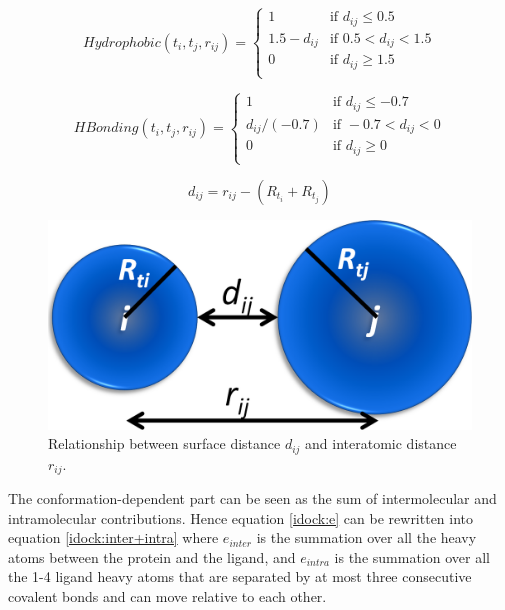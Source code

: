 \begin{equation}
\label{idock:Hydrophobic}
Hydrophobic(t_i, t_j, r_{ij}) =
\begin{cases}
1 & \text{if } d_{ij} \leq 0.5\\
1.5 - d_{ij} & \text{if } 0.5 < d_{ij} < 1.5\\
0 & \text{if } d_{ij} \geq 1.5\\
\end{cases}
\end{equation}

\begin{equation}
\label{idock:HBonding}
HBonding(t_i, t_j, r_{ij}) =
\begin{cases}
1 & \text{if } d_{ij} \leq -0.7\\
d_{ij} / (-0.7) & \text{if } -0.7 < d_{ij} < 0\\
0 & \text{if } d_{ij} \geq 0\\
\end{cases}
\end{equation}

\begin{equation}
\label{idock:d_ij}
d_{ij} = r_{ij} - (R_{t_i} + R_{t_j})
\end{equation}

\begin{figure}
\centering
\includegraphics[width=\linewidth]{../idock/Distance.png}
\caption{Relationship between surface distance $d_{ij}$ and interatomic distance $r_{ij}$.}
\label{idock:Distance}
\end{figure}

The conformation-dependent part can be seen as the sum of intermolecular and intramolecular contributions. Hence equation \eqref{idock:e} can be rewritten into equation \eqref{idock:inter+intra} where $e_{inter}$ is the summation over all the heavy atoms between the protein and the ligand, and $e_{intra}$ is the summation over all the 1-4 ligand heavy atoms that are separated by at most three consecutive covalent bonds and can move relative to each other.

